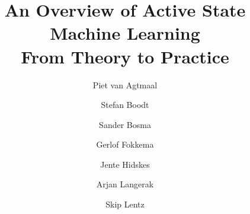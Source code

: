 \documentclass[a4paper]{article}
\title{An Overview of Active State Machine Learning \\ {\large From Theory to Practice}}
\author{%
Piet van Agtmaal \and
Stefan Boodt \and
Sander Bosma \and
Gerlof Fokkema \and
Jente Hidskes \and
Arjan Langerak \and
Skip Lentz}
\date{}
\begin{document}
\maketitle





















{}


\end{document}
